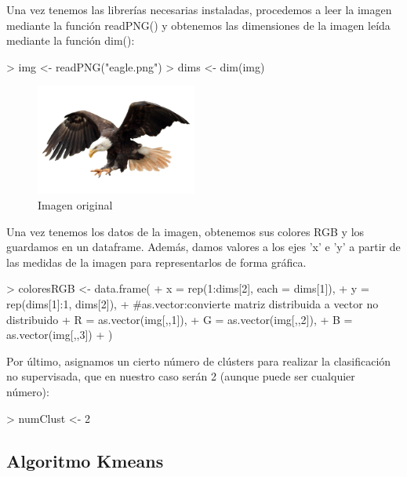 \documentclass [a4paper] {article}
\begin{document}
Una vez tenemos las librerías necesarias instaladas, procedemos a leer la imagen mediante la función readPNG() y obtenemos las dimensiones de la imagen leída mediante la función dim():

\begin{Schunk}
\begin{Sinput}
> img <- readPNG("eagle.png")
> dims <- dim(img)
\end{Sinput}
\end{Schunk}


\begin{figure}[!htbp]
  \centering
  \includegraphics[width=200px,keepaspectratio]{./eagle.png}
  \caption{Imagen original}
  \label{fig:original}
\end{figure}

Una vez tenemos los datos de la imagen, obtenemos sus colores RGB y los guardamos en un dataframe. Además, damos valores a los ejes 'x' e 'y' a partir de las medidas de la imagen para representarlos de forma gráfica.

\begin{Schunk}
\begin{Sinput}
> coloresRGB <- data.frame(
+   x = rep(1:dims[2], each = dims[1]),
+   y = rep(dims[1]:1, dims[2]),
+   #as.vector:convierte matriz distribuida a vector no distribuido
+   R = as.vector(img[,,1]), 
+   G = as.vector(img[,,2]),
+   B = as.vector(img[,,3])
+   )
\end{Sinput}
\end{Schunk}

Por último, asignamos un cierto número de clústers para realizar la clasificación no supervisada, que en nuestro caso serán 2 (aunque puede ser cualquier número):

\begin{Schunk}
\begin{Sinput}
> numClust <- 2
\end{Sinput}
\end{Schunk}


\subsection{Algoritmo Kmeans}
\end{document}
